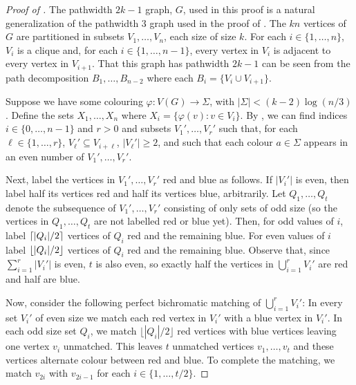\documentclass{patmorin}
\begin{document}
\begin{proof}[Proof of ]
The pathwidth $2k-1$ graph, $G$, used in this proof is a natural
generalization of the pathwidth $3$ graph used in the proof of
.  The $kn$ vertices of $G$ are partitioned in subsets
$V_1,\ldots,V_n$, each size of size $k$.  For each $i\in\{1,\ldots,n\}$,
$V_i$ is a clique and, for each $i\in\{1,\ldots,n-1\}$, every
vertex in $V_i$ is adjacent to every vertex in $V_{i+1}$.  That this
graph has pathwidth $2k-1$ can be seen from the path decomposition
$B_1,\ldots,B_{n-2}$ where each $B_i=\{V_i\cup V_{i+1}\}$.

Suppose we have some colouring $\varphi:V(G)\to\Sigma$, with
$|\Sigma|<(k-2)\log(n/3)$.  Define the sets $X_1,\ldots,X_n$ where
$X_i=\{\varphi(v): v\in V_i\}$.  By , we can find indices
$i\in\{0,\ldots,n-1\}$ and $r>0$ and subsets $V_1',\ldots,V_{r}'$ such
that, for each $\ell\in\{1,\ldots,r\}$,  $V_\ell'\subseteq V_{i+\ell}$, $|V_\ell'|\ge 2$,
and such that each colour $a\in\Sigma$ appears in an even number of
$V_1',\ldots,V_r'$.

Next, label the vertices in $V_1',\ldots,V_r'$ red and blue as
follows.  If $|V_i'|$ is even, then label half its vertices red and
half its vertices blue, arbitrarily.  Let $Q_1,\ldots,Q_t$ denote the
subsequence of $V_1',\ldots,V_r'$ consisting of only sets of odd size
(so the vertices in $Q_1,\ldots,Q_t$ are not labelled red or blue yet).
Then, for odd values of $i$, label ${\lceil |Q_i|/2 \rceil}$ vertices
of $Q_i$ red and the remaining blue.  For even values of $i$ label
${\lfloor |Q_i|/2 \rfloor}$ vertices of $Q_i$ red and the remaining blue.
Observe that, since $\sum_{i=1}^r|V_i'|$ is even, $t$ is also even,
so exactly half the vertices in $\bigcup_{i=1}^r V_i'$ are red and half
are blue.

Now, consider the following perfect bichromatic matching of
$\bigcup_{i=1}^r V_i'$: In every set $V_i'$ of even size we match each
red vertex in $V_i'$ with a blue vertex in $V_i'$.  In each odd size set
$Q_i$, we match $\lfloor|Q_i|/2\rfloor$ red vertices with blue vertices
leaving one vertex $v_i$ unmatched.  This leaves $t$ unmatched vertices
$v_1,\ldots,v_t$ and these vertices alternate colour between red and
blue. To complete the matching, we match $v_{2i}$ with $v_{2i-1}$ for
each $i\in\{1,\ldots,t/2\}$.


\end{proof}
\end{document}
